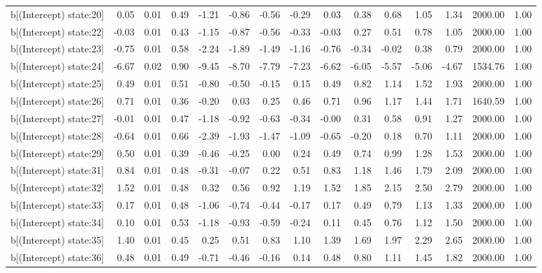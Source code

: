 \begin{table}[ht]
\begin{tabular}{rrrrrrrrrrrrrrr}
  b[(Intercept) state:20] & 0.05 & 0.01 & 0.49 & -1.21 & -0.86 & -0.56 & -0.29 & 0.03 & 0.38 & 0.68 & 1.05 & 1.34 & 2000.00 & 1.00 \\ 
  b[(Intercept) state:22] & -0.03 & 0.01 & 0.43 & -1.15 & -0.87 & -0.56 & -0.33 & -0.03 & 0.27 & 0.51 & 0.78 & 1.05 & 2000.00 & 1.00 \\ 
  b[(Intercept) state:23] & -0.75 & 0.01 & 0.58 & -2.24 & -1.89 & -1.49 & -1.16 & -0.76 & -0.34 & -0.02 & 0.38 & 0.79 & 2000.00 & 1.00 \\ 
  b[(Intercept) state:24] & -6.67 & 0.02 & 0.90 & -9.45 & -8.70 & -7.79 & -7.23 & -6.62 & -6.05 & -5.57 & -5.06 & -4.67 & 1534.76 & 1.00 \\ 
  b[(Intercept) state:25] & 0.49 & 0.01 & 0.51 & -0.80 & -0.50 & -0.15 & 0.15 & 0.49 & 0.82 & 1.14 & 1.52 & 1.93 & 2000.00 & 1.00 \\ 
  b[(Intercept) state:26] & 0.71 & 0.01 & 0.36 & -0.20 & 0.03 & 0.25 & 0.46 & 0.71 & 0.96 & 1.17 & 1.44 & 1.71 & 1640.59 & 1.00 \\ 
  b[(Intercept) state:27] & -0.01 & 0.01 & 0.47 & -1.18 & -0.92 & -0.63 & -0.34 & -0.00 & 0.31 & 0.58 & 0.91 & 1.27 & 2000.00 & 1.00 \\ 
  b[(Intercept) state:28] & -0.64 & 0.01 & 0.66 & -2.39 & -1.93 & -1.47 & -1.09 & -0.65 & -0.20 & 0.18 & 0.70 & 1.11 & 2000.00 & 1.00 \\ 
  b[(Intercept) state:29] & 0.50 & 0.01 & 0.39 & -0.46 & -0.25 & 0.00 & 0.24 & 0.49 & 0.74 & 0.99 & 1.28 & 1.53 & 2000.00 & 1.00 \\ 
  b[(Intercept) state:31] & 0.84 & 0.01 & 0.48 & -0.31 & -0.07 & 0.22 & 0.51 & 0.83 & 1.18 & 1.46 & 1.79 & 2.09 & 2000.00 & 1.00 \\ 
  b[(Intercept) state:32] & 1.52 & 0.01 & 0.48 & 0.32 & 0.56 & 0.92 & 1.19 & 1.52 & 1.85 & 2.15 & 2.50 & 2.79 & 2000.00 & 1.00 \\ 
  b[(Intercept) state:33] & 0.17 & 0.01 & 0.48 & -1.06 & -0.74 & -0.44 & -0.17 & 0.17 & 0.49 & 0.79 & 1.13 & 1.33 & 2000.00 & 1.00 \\ 
  b[(Intercept) state:34] & 0.10 & 0.01 & 0.53 & -1.18 & -0.93 & -0.59 & -0.24 & 0.11 & 0.45 & 0.76 & 1.12 & 1.50 & 2000.00 & 1.00 \\ 
  b[(Intercept) state:35] & 1.40 & 0.01 & 0.45 & 0.25 & 0.51 & 0.83 & 1.10 & 1.39 & 1.69 & 1.97 & 2.29 & 2.65 & 2000.00 & 1.00 \\ 
  b[(Intercept) state:36] & 0.48 & 0.01 & 0.49 & -0.71 & -0.46 & -0.16 & 0.14 & 0.48 & 0.80 & 1.11 & 1.45 & 1.82 & 2000.00 & 1.00 \\ 

\end{tabular}
\end{table}
